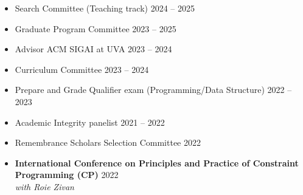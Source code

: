 
\smallskip
{}
  \begin{itemize}
    \item Search Committee (Teaching track) \hfill 2024 -- 2025
    \item Graduate Program Committee \hfill 2023 -- 2025
    \item Advisor ACM SIGAI at UVA  \hfill 2023 -- 2024
  \end{itemize}

  \begin{itemize}
    \item Curriculum Committee \hfill 2023 -- 2024
    \item Prepare and Grade Qualifier exam (Programming/Data Structure) \hfill 2022 -- 2023
    \item Academic Integrity panelist \hfill 2021 -- 2022
    \item Remembrance Scholars Selection Committee \hfill 2022
  \end{itemize}


\smallskip
{}
\begin{itemize}    
    \item {\bf International Conference on Principles and Practice of Constraint Programming (CP)}  \hfill{2022} \\
    {\em with Roie Zivan}
\end{itemize}

